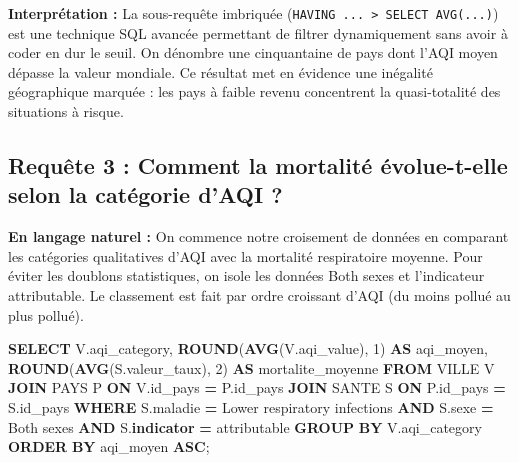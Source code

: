 \documentclass[mstat,12pt]{unswthesis}
\newenvironment{Shaded}{\begin{snugshade}}{\end{snugshade}}
\newcommand{\DecValTok}[1]{\textcolor[rgb]{0.00,0.00,0.81}{#1}}
\newcommand{\FunctionTok}[1]{\textcolor[rgb]{0.13,0.29,0.53}{\textbf{#1}}}
\newcommand{\KeywordTok}[1]{\textcolor[rgb]{0.13,0.29,0.53}{\textbf{#1}}}
\newcommand{\NormalTok}[1]{#1}
\newcommand{\OperatorTok}[1]{\textcolor[rgb]{0.81,0.36,0.00}{\textbf{#1}}}
\newcommand{\StringTok}[1]{\textcolor[rgb]{0.31,0.60,0.02}{#1}}
\begin{document}
\textbf{Interprétation :} La sous-requête imbriquée
(\texttt{HAVING\ ...\ \textgreater{}\ SELECT\ AVG(...)}) est une
technique SQL avancée permettant de filtrer dynamiquement sans avoir à
coder en dur le seuil. On dénombre une cinquantaine de pays dont l'AQI
moyen dépasse la valeur mondiale. Ce résultat met en évidence une
inégalité géographique marquée : les pays à faible revenu concentrent la
quasi-totalité des situations à risque.

\medskip

\subsection{Requête 3 : Comment la mortalité évolue-t-elle selon la
catégorie d'AQI
?}\label{requuxeate-3-comment-la-mortalituxe9-uxe9volue-t-elle-selon-la-catuxe9gorie-daqi}

\textbf{En langage naturel :} On commence notre croisement de données en
comparant les catégories qualitatives d'AQI avec la mortalité
respiratoire moyenne. Pour éviter les doublons statistiques, on isole
les données Both sexes et l'indicateur attributable. Le classement est
fait par ordre croissant d'AQI (du moins pollué au plus pollué).

\begin{Shaded}
\begin{Highlighting}[]
\KeywordTok{SELECT}\NormalTok{ V.aqi\_category, }
       \FunctionTok{ROUND}\NormalTok{(}\FunctionTok{AVG}\NormalTok{(V.aqi\_value), }\DecValTok{1}\NormalTok{) }\KeywordTok{AS}\NormalTok{ aqi\_moyen, }
       \FunctionTok{ROUND}\NormalTok{(}\FunctionTok{AVG}\NormalTok{(S.valeur\_taux), }\DecValTok{2}\NormalTok{) }\KeywordTok{AS}\NormalTok{ mortalite\_moyenne }
\KeywordTok{FROM}\NormalTok{ VILLE V }
\KeywordTok{JOIN}\NormalTok{ PAYS P }\KeywordTok{ON}\NormalTok{ V.id\_pays }\OperatorTok{=}\NormalTok{ P.id\_pays }
\KeywordTok{JOIN}\NormalTok{ SANTE S }\KeywordTok{ON}\NormalTok{ P.id\_pays }\OperatorTok{=}\NormalTok{ S.id\_pays }
\KeywordTok{WHERE}\NormalTok{ S.maladie }\OperatorTok{=} \StringTok{\textquotesingle{}Lower respiratory infections\textquotesingle{}} 
  \KeywordTok{AND}\NormalTok{ S.sexe }\OperatorTok{=} \StringTok{\textquotesingle{}Both sexes\textquotesingle{}}
  \KeywordTok{AND}\NormalTok{ S.}\KeywordTok{indicator} \OperatorTok{=} \StringTok{\textquotesingle{}attributable\textquotesingle{}}
\KeywordTok{GROUP} \KeywordTok{BY}\NormalTok{ V.aqi\_category }
\KeywordTok{ORDER} \KeywordTok{BY}\NormalTok{ aqi\_moyen }\KeywordTok{ASC}\NormalTok{;}
\end{Highlighting}
\end{Shaded}
\end{document}
